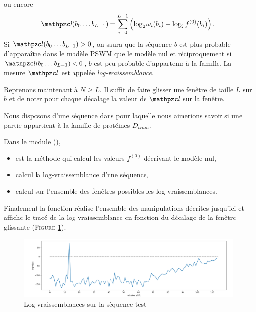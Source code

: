 \documentclass[a4paper, french]{article}
\begin{document}
\newpage
ou encore
\begin{equation*}
    \lodd(b_0\ldots b_{L-1}) =
    \sum_{i=0}^{L-1} \left(\log_2 \omega_i(b_i) - \log_2 f^{(0)}(b_i)\right).
\end{equation*}
Si $\lodd(b_0\ldots b_{L-1})>0$, on saura que la s\'equence $b$
est plus probable d'appara\^itre dans le mod\`ele PSWM que le mod\`ele nul
et r\'eciproquement si $\lodd(b_0\ldots b_{L-1})<0$, $b$ est peu probable d'appartenir \`a la famille. 
La mesure $\lodd$ est appel\'ee \emph{log-vraissemblance}.

Reprenons maintenant \`a $N\geq L$. Il suffit de faire glisser une fen\^etre
de taille $L$ sur $b$ et de noter pour chaque d\'ecalage la valeur de $\lodd$
sur la fen\^etre.

Nous disposons d'une s\'equence dans  pour laquelle
nous aimerions savoir si une partie appartient \`a la famille de
prot\'eines $D_{train}$.

Dans le module  (),
\begin{itemize}
    \item {} est la m\'ethode qui calcul les
        valeurs $f^{(0)}$  d\'ecrivant le mod\`ele nul,
    \item {} calcul la log-vraissemblance
        d'une s\'equence,
    \item {} calcul sur l'ensemble des
        fen\^etres possibles les log-vraissemblances.
\end{itemize}
Finalement la fonction  r\'ealise l'ensemble des manipulations
d\'ecrites jusqu'ici et affiche le trac\'e de la log-vraissemblance en fonction
du d\'ecalage de la fen\^etre glissante
(F\textsc{igure} \ref{fig:log_odds}).

\begin{figure}[h]
    \begin{center}
        \includegraphics[width=15cm]{images/log_odds}
        \caption{Log-vraissemblances sur la s\'equence test}
        \label{fig:log_odds}
    \end{center}
\end{figure}
\end{document}

